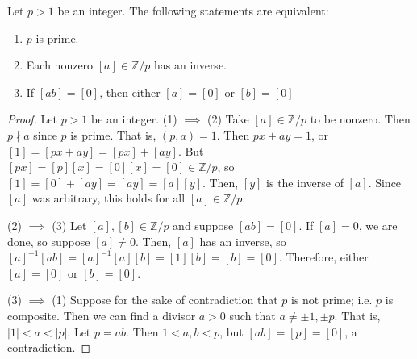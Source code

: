 \documentclass [12pt] {article}
\newcommand{\Z}{\mathbb{Z}}
\newenvironment{theorem}[1]{\begin{tcolorbox}[title={Theorem #1}]}{\end{tcolorbox}}
\begin{document}
\begin{theorem}{}
    Let $p > 1$ be an integer. The following statements are equivalent:
    \begin{enumerate}[label=(\arabic*)]
        \item $p$ is prime.
        \item Each nonzero $[a] \in \Z/p$ has an inverse.
        \item If $[ab] = [0]$, then either $[a] = [0]$ or $[b] = [0]$
    \end{enumerate}
\end{theorem}
\begin{proof}
    Let $p > 1$ be an integer.
    \newline
    (1) $\implies$ (2)
    Take $[a] \in \Z/p$ to be nonzero. Then $p \nmid a$ since $p$ is prime. That is, $(p, a) = 1$.
    Then $px + ay = 1$, or 
    $[1] = [px + ay]  = [px] + [ay]$. But $[px] = [p][x] = [0][x] = [0] \in \Z/p$, so 
    $[1] = [0] + [ay] = [ay] = [a][y]$. Then, $[y]$ is the inverse of $[a]$. Since $[a]$ was
    arbitrary, this holds for all $[a] \in \Z/p$.
    \vspace{0.5em}

    (2) $\implies$ (3)
    Let $[a], [b] \in \Z/p$ and suppose $[ab] = [0]$. If $[a] = 0$, we are done, so suppose 
    $[a] \neq 0$. Then, $[a]$ has an inverse, so 
    $[a]^{-1} [ab] = [a]^{-1}[a] [b] = [1][b] = [b] = [0]$. Therefore, either $[a] = [0]$ or 
    $[b] = [0]$.
    \vspace{0.5em}

    (3) $\implies$ (1)
    Suppose for the sake of contradiction that $p$ is not prime; i.e. $p$ is composite. Then we can
    find a divisor $a > 0$ such that $a \neq \pm 1, \pm p$. That is, $|1| < a < |p|$. Let $p = ab$.
    Then $1 < a, b < p$, but $[ab] = [p] = [0]$, a contradiction.
\end{proof}
\end{document}
